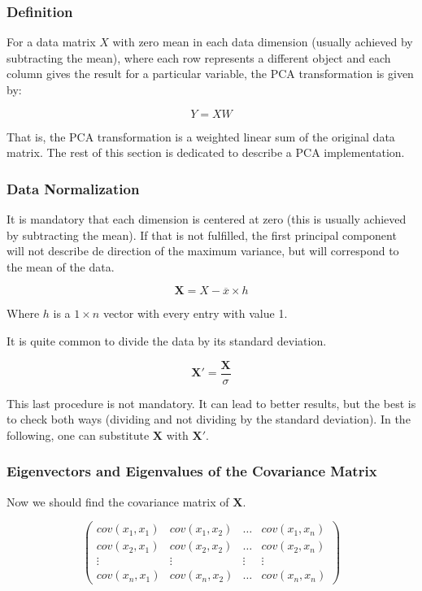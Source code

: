 \documentclass[12pt]{article}
\begin{document}
\subsubsection{Definition}
For a data matrix $X$ with zero mean in each data dimension (usually achieved by subtracting the mean),
where each row represents a different object and each column gives the result for a particular variable,
the PCA transformation is given by:

\begin{equation}
  Y = XW
\end{equation} 

That is, the PCA transformation is a weighted linear sum of the original data matrix.
The rest of this section is dedicated to describe a PCA implementation.

\subsubsection{Data Normalization}
It is mandatory that each dimension is centered at zero (this is usually achieved by
 subtracting the mean). If that is not fulfilled, the first principal component
will not describe de direction of the maximum variance, but will correspond to the
mean of the data.

\begin{equation}
  \mathbf{X}=X-\overline{x} \times h
\end{equation}

Where $h$ is a $1 \times n$ vector with every entry with value 1.

It is quite common to divide the data by its standard deviation.

\begin{equation}
  \mathbf{X'}=\frac{\mathbf{X}}{\sigma}
\end{equation}

This last procedure is not mandatory. It can lead to better results, but the best
is to check both ways (dividing and not dividing by the standard deviation).
In the following, one can substitute $\mathbf{X}$ with
$\mathbf{X'}$.

\subsubsection{Eigenvectors and Eigenvalues of the Covariance Matrix}
Now we should find the covariance matrix of $\mathbf{X}$.

\begin{equation}
  \left(
    \begin{array}{cccc}
      cov(x_1,x_1) & cov(x_1,x_2) & \dots  & cov(x_1,x_n) \\
      cov(x_2,x_1) & cov(x_2,x_2) & \dots  & cov(x_2,x_n) \\
      \vdots       & \vdots       & \vdots & \vdots       \\
      cov(x_n,x_1) & cov(x_n,x_2) & \dots  & cov(x_n,x_n)
    \end{array}
  \right)
\end{equation}
\end{document}
